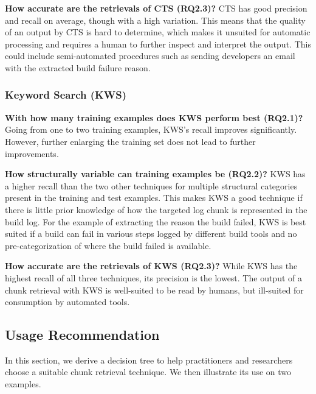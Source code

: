 \noindent
\textbf{How accurate are the retrievals of CTS (RQ2.3)?}
CTS has good precision and recall on average, though with a high
variation.
This means that the quality of an output by CTS is hard to
determine, which makes it unsuited for automatic processing and requires
a human to further inspect and interpret the output.
This could include semi-automated procedures such as sending
developers an email with the extracted build failure reason.

\subsubsection{Keyword Search (KWS)}
\noindent
\textbf{With how many training examples does KWS perform best (RQ2.1)?}
Going from one to two training examples, KWS's recall improves
significantly.
However, further enlarging the training set
does not lead to further improvements.

\noindent
\textbf{How structurally variable can training examples be (RQ2.2)?}
KWS has a higher recall than the two other techniques for multiple
structural categories present in the training and test examples.
This
makes KWS a good technique if there is little prior knowledge of how
the targeted log chunk is represented in the build log.
For the
example of extracting the reason the build failed, KWS is best suited
if a build can fail in various steps logged by different build
tools and no
pre-categorization of where the build failed is available.

\noindent
\textbf{How accurate are the retrievals of KWS (RQ2.3)?}
While KWS has the highest recall of all three techniques, its
precision is the lowest.
The output of a chunk retrieval with KWS is
well-suited to be read by humans, but ill-suited for consumption by
automated tools.


\subsection{Usage Recommendation}
In this section, we derive a decision tree to help practitioners and
researchers choose a suitable chunk retrieval technique.
We then
illustrate its use on two examples.

